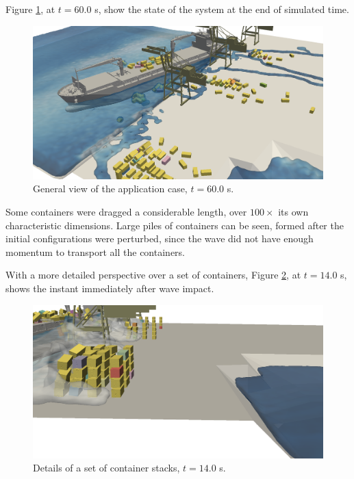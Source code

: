 Figure \ref{fig:sines_t300}, at $t=60.0$ s, show the state of the system at the end of simulated time.
\begin{figure}[H]
	\centering
	\includegraphics[width=0.95\linewidth]{Figures/6.Chapter/sines_t300_II} 
	\caption{General view of the application case, $t=60.0$ s.}
	\label{fig:sines_t300} 
\end{figure}
%
Some containers were dragged a considerable length, over $100\times$ its own characteristic dimensions. Large piles of containers can be seen, formed after the initial configurations were perturbed, since the wave did not have enough momentum to transport all the containers.

With a more detailed perspective over a set of containers, Figure \ref{fig:cont_t70}, at $t=14.0$ s, shows the instant immediately after wave impact. 
%
\begin{figure}[H]
	\centering
	\includegraphics[width=0.95\linewidth]{Figures/6.Chapter/cont_t70} 
	\caption{Details of a set of container stacks, $t=14.0$ s.}
	\label{fig:cont_t70} 
\end{figure}
% 

